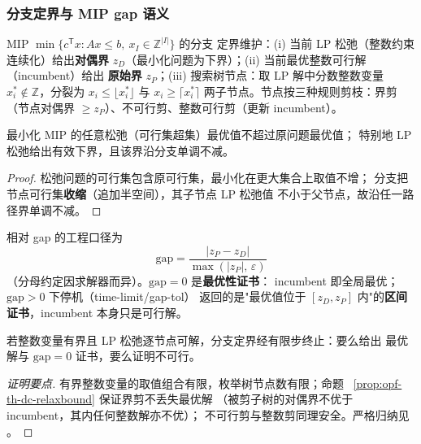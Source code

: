 \subsubsection{分支定界与 MIP gap 语义}

\begin{definition}[分支定界（B\&B）]\label{def:opf-th-dc-bb}
MIP $\min\{c^{\mathsf T}x:Ax\le b,\ x_I\in\mathbb Z^{|I|}\}$ 的分支
定界维护：(i) 当前 LP 松弛（整数约束连续化）给出\textbf{对偶界}
$z_D$（最小化问题为下界）；(ii) 当前最优整数可行解（incumbent）给出
\textbf{原始界} $z_P$；(iii) 搜索树节点：取 LP 解中分数整数变量
$x_i^*\notin\mathbb Z$，分裂为 $x_i\le\lfloor x_i^*\rfloor$ 与
$x_i\ge\lceil x_i^*\rceil$ 两子节点。节点按三种规则剪枝：界剪
（节点对偶界 $\ge z_P$）、不可行剪、整数可行剪（更新 incumbent）。
\end{definition}

\begin{proposition}[松弛界有效性]\label{prop:opf-th-dc-relaxbound}
最小化 MIP 的任意松弛（可行集超集）最优值不超过原问题最优值；
特别地 LP 松弛给出有效下界，且该界沿分支单调不减。
\end{proposition}

\begin{proof}
松弛问题的可行集包含原可行集，最小化在更大集合上取值不增；
分支把节点可行集\textbf{收缩}（追加半空间），其子节点 LP 松弛值
不小于父节点，故沿任一路径界单调不减。
\end{proof}

\begin{definition}\label{def:opf-th-dc-mipgap}
相对 gap 的工程口径为
\begin{equation}
\mathrm{gap}=\frac{|z_P-z_D|}{\max(|z_P|,\,\varepsilon)}
\label{eq:opf-th-dc-mipgap}
\end{equation}
（分母约定因求解器而异）。$\mathrm{gap}=0$ 是\textbf{最优性证书}：
incumbent 即全局最优；$\mathrm{gap}>0$ 下停机（time-limit/gap-tol）
返回的是"最优值位于 $[z_D,z_P]$ 内"的\textbf{区间证书}，incumbent
本身只是可行解。
\end{definition}

\begin{proposition}[B\&B 有限终止]\label{prop:opf-th-dc-bbterm}
若整数变量有界且 LP 松弛逐节点可解，分支定界经有限步终止：要么给出
最优解与 $\mathrm{gap}=0$ 证书，要么证明不可行。
\end{proposition}

\begin{proof}[证明要点]
有界整数变量的取值组合有限，枚举树节点数有限；命题
~\ref{prop:opf-th-dc-relaxbound} 保证界剪不丢失最优解
（被剪子树的对偶界不优于 incumbent，其内任何整数解亦不优）；
不可行剪与整数剪同理安全。严格归纳见
\cite{opfdc:nemhauser-wolsey,opfdc:wolsey}。
\end{proof}

